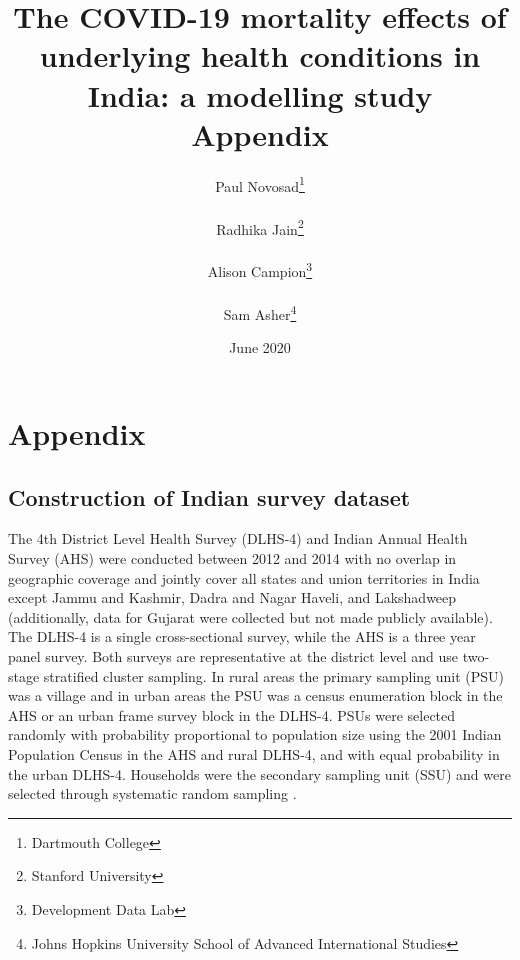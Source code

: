 \documentclass[10pt,letterpaper]{article}
\title{The COVID-19 mortality effects of underlying health conditions in India: a modelling study \\ Appendix} \author{Paul Novosad\thanks{Dartmouth College} \\ \\ Radhika Jain\thanks{Stanford University} \\ \\ Alison Campion\thanks{Development Data Lab} \\ \\ Sam Asher\thanks{Johns Hopkins University School of Advanced International Studies}}
\numberwithin{equation}{section}
\begin{document}
\date{June 2020}

\maketitle

\section{Appendix}

\subsection{Construction of Indian survey dataset}
The 4th District Level Health Survey (DLHS-4) and Indian Annual Health Survey (AHS) were conducted between 2012 and 2014 with no overlap in geographic coverage and jointly cover all states and union territories in India except Jammu and Kashmir, Dadra and Nagar Haveli, and Lakshadweep (additionally, data for Gujarat were collected but not made publicly available). The DLHS-4 is a single cross-sectional survey, while the AHS is a three year panel survey. Both surveys are representative at the district level and use two-stage stratified cluster sampling. In rural areas the primary sampling unit (PSU) was a village and in urban areas the PSU was a census enumeration block in the AHS or an urban frame survey block in the DLHS-4. PSUs were selected randomly with probability proportional to population size using the 2001 Indian Population Census in the AHS and rural DLHS-4, and with equal probability in the urban DLHS-4. Households were the secondary sampling unit (SSU) and were selected through systematic random sampling \cite{noauthor_annual_2014-1}.
\end{document}
